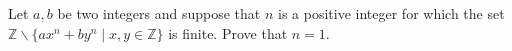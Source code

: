 Let $a,b$ be two integers and suppose that $n$ is a positive integer for which the set $\mathbb{Z} \backslash \{ax^n + by^n \mid x,y \in \mathbb{Z}\}$ is finite. Prove that $n=1$.